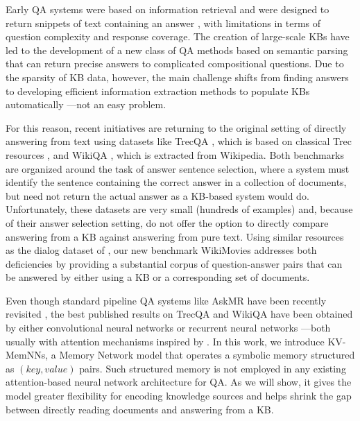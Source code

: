
Early QA systems were based on information retrieval and were designed
to return snippets of text containing an answer
\citep{voorhees2000building,banko2002askmsr}, with limitations in terms of question
complexity and response coverage.
%
The creation of large-scale KBs
\citep{auer2007dbpedia,bollacker2008freebase} have led to the
development of a new class of QA methods based on semantic parsing
\citep{berant2013semantic,kwiatkowski-EtAl:2013:EMNLP,fader2014open,yih2015semantic}
that can return precise answers to complicated compositional questions.
%
Due to the sparsity of KB data, however, the main challenge
shifts from finding answers to developing efficient information
extraction methods to populate KBs automatically
\citep{craven2000learning,carlson2010toward}---not an easy
problem.

For this reason, recent initiatives are returning to the original
setting of directly answering from text using
datasets like {\sc TrecQA} \citep{wang2007jeopardy},
which is based on classical {\sc Trec} resources \citep{voorhees1999trec},
and {\sc WikiQA} \citep{yang2015wikiqa}, which is extracted from Wikipedia.
%
Both benchmarks are organized around the task of answer sentence
selection, where a system must identify the sentence containing
the correct answer in a collection of documents, but need not return the
actual answer as a KB-based system would do.
%
Unfortunately, these datasets are very small (hundreds of
examples) and, because of their answer selection setting, do not
offer the option to directly compare answering from a KB against answering from pure text.
%
Using similar resources as the dialog dataset
of \cite{dodge2015evaluating}, our new benchmark {\sc WikiMovies}
addresses both deficiencies by providing a substantial
corpus of question-answer pairs that can be answered by either using a
KB or a corresponding set of documents.




Even though standard pipeline QA systems like AskMR
\citep{banko2002askmsr} have been recently revisited
\citep{tsai2015web},
%
the best published results on {\sc TrecQA} and {\sc WikiQA} have been
obtained by either convolutional neural networks
\citep{santos2016attentive,yin2015convolutional,wang2016sentence} or
recurrent neural networks \citep{miao2015neural}---both usually with
attention mechanisms inspired by \citep{bahdanau2014neural}.
%
In this work, we introduce KV-MemNNs, a Memory Network model that operates a symbolic memory structured as $(key, value)$ pairs.
Such structured memory is not employed
 in any existing attention-based neural network architecture for QA.
As we will show, it gives the model greater
flexibility for encoding knowledge sources
and helps shrink the gap between
directly reading documents and answering from a KB.




